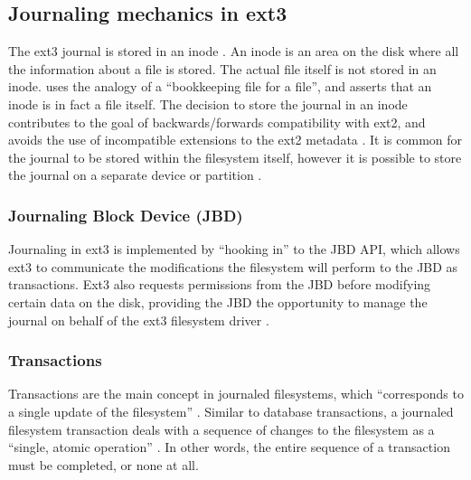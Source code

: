 \subsection{Journaling mechanics in ext3}

The ext3 journal is stored in an inode \citep{Robbins2001, Tweedie2000}. An inode is an area on the disk where all the information about a file is stored. The actual file itself is not stored in an inode. \citet[p. 2]{Best2002} uses the analogy of a ``bookkeeping file for a file'', and asserts that an inode is in fact a file itself. The decision to store the journal in an inode contributes to the goal of backwards/forwards compatibility with ext2, and avoids the use of incompatible extensions to the ext2 metadata \citep{Robbins2001}. It is common for the journal to be stored within the filesystem itself, however it is possible to store the journal on a separate device or partition \citep{Prabhakaran2005a, Tweedie2000}.

\subsubsection{Journaling Block Device (JBD)}

Journaling in ext3 is implemented by ``hooking in'' to the JBD API, which allows ext3 to communicate the modifications the filesystem will perform to the JBD as transactions. Ext3 also requests permissions from the JBD before modifying certain data on the disk, providing the JBD the opportunity to manage the journal on behalf of the ext3 filesystem driver \citep{Robbins2001}.

\subsubsection{Transactions}

Transactions are the main concept in journaled filesystems, which ``corresponds to a single update of the filesystem'' \citep[p. 4]{Tweedie1998}. Similar to database transactions, a journaled filesystem transaction deals with a sequence of changes to the filesystem as a ``single, atomic operation'' \citep[p. 4]{Best2002}. In other words, the entire sequence of a transaction must be completed, or none at all.